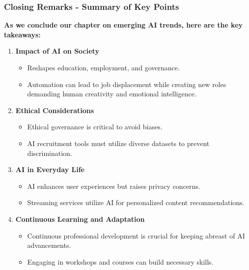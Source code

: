 \documentclass[aspectratio=169]{beamer}
\begin{document}
\begin{frame}[fragile]
    \frametitle{Closing Remarks - Summary of Key Points}
    
    \textbf{As we conclude our chapter on emerging AI trends, here are the key takeaways:}
    
    \begin{enumerate}
        \item \textbf{Impact of AI on Society}
        \begin{itemize}
            \item Reshapes education, employment, and governance.
            \item Automation can lead to job displacement while creating new roles demanding human creativity and emotional intelligence.
        \end{itemize}
        
        \item \textbf{Ethical Considerations}
        \begin{itemize}
            \item Ethical governance is critical to avoid biases.
            \item AI recruitment tools must utilize diverse datasets to prevent discrimination.
        \end{itemize}
        
        \item \textbf{AI in Everyday Life}
        \begin{itemize}
            \item AI enhances user experiences but raises privacy concerns.
            \item Streaming services utilize AI for personalized content recommendations.
        \end{itemize}

        \item \textbf{Continuous Learning and Adaptation}
        \begin{itemize}
            \item Continuous professional development is crucial for keeping abreast of AI advancements.
            \item Engaging in workshops and courses can build necessary skills.
        \end{itemize}
    \end{enumerate}
\end{frame}
\end{document}
